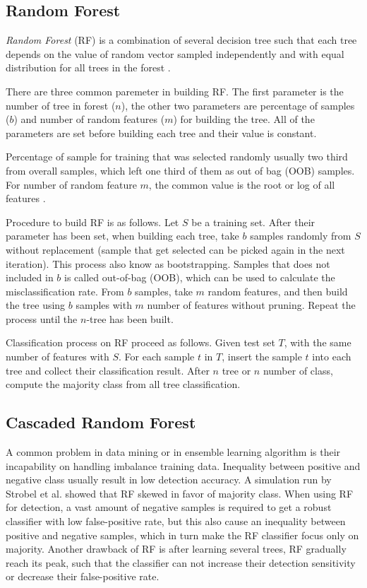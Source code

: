 \documentclass[conference,compsoc,a4paper,twocolumn,final]{IEEEtran}
\begin{document}
\subsection{Random Forest}
\label{subsection:rf}

\textit{Random Forest} (RF)
is a combination of several decision tree such that each tree depends on the
value of random vector sampled independently and with equal distribution for
all trees in the forest
\cite{breiman2001random}.

There are three common paremeter in building RF.
The first parameter is the number of tree in forest ($n$),
the other two parameters are percentage of samples ($b$) and number of random
features ($m$) for building the tree.
All of the parameters are set before building each tree and their value is
constant.

Percentage of sample for training that was selected randomly usually two third
from overall samples, which left one third of them as out of bag (OOB) samples.
For number of random feature $m$, the common value is the root or log of all
features \cite{breiman2001random}.

Procedure to build RF is as follows.
Let $S$ be a training set.
After their parameter has been set, when building each tree, take $b$ samples
randomly from $S$ without replacement (sample that get selected can be picked
again in the next iteration).
This process also know as bootstrapping.
Samples that does not included in $b$ is called out-of-bag (OOB), which can be
used to calculate the misclassification rate.
From $b$ samples, take $m$ random features, and then build the tree using $b$
samples with $m$ number of features without pruning.
Repeat the process until the $n$-tree has been built.

Classification process on RF proceed as follows.
Given test set $T$, with the same number of features with $S$.
For each sample $t$ in $T$, insert the sample $t$ into each tree and collect
their classification result.
After $n$ tree or $n$ number of class, compute the majority class from all
tree classification.

\subsection{Cascaded Random Forest}
\label{subsection:crf}

A common problem in data mining or in ensemble learning algorithm is their
incapability on handling imbalance training data.
Inequality between positive and negative class usually result in low
detection accuracy.
A simulation run by Strobel et al. \cite{strobl2007bias} showed that RF skewed
in favor of majority class.
When using RF for detection, a vast amount of negative samples is required to
get a robust classifier with low false-positive rate, but this also cause an
inequality between positive and negative samples, which in turn make the RF
classifier focus only on majority.
Another drawback of RF is after learning several trees, RF gradually reach its
peak, such that the classifier can not increase their detection sensitivity or
decrease their false-positive rate.
\end{document}
